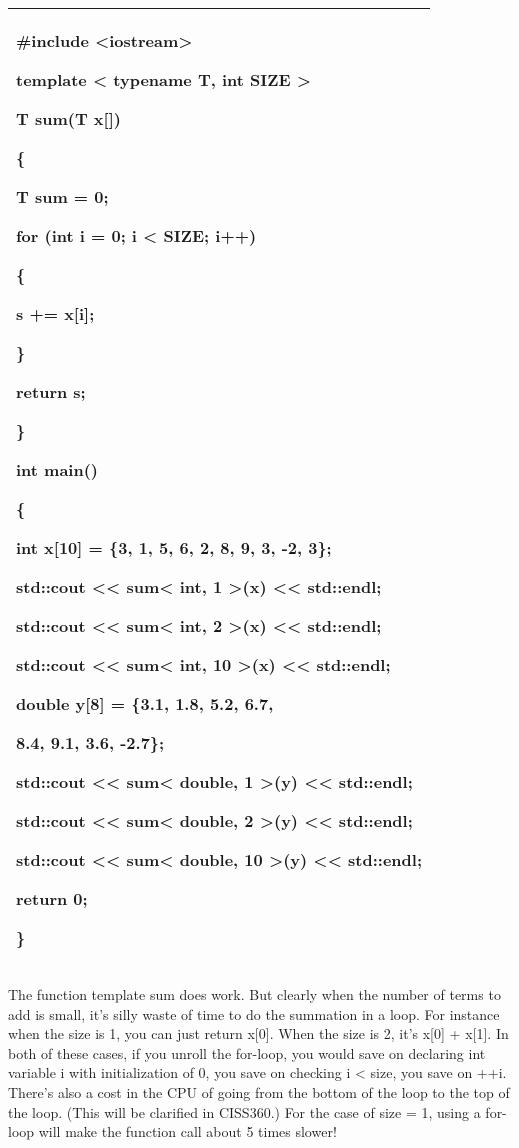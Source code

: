 \documentclass[
]{article}
\begin{document}
\begin{longtable}[]{@{}l@{}}
\toprule
\endhead
\begin{minipage}[t]{0.97\columnwidth}\raggedright
\#include \textless iostream\textgreater{}

template \textless{} typename T, int SIZE \textgreater{}

T sum(T x{[}{]})

\{

T sum = 0;

for (int i = 0; i \textless{} SIZE; i++)

\{

s += x{[}i{]};

\}

return s;

\}

int main()

\{

int x{[}10{]} = \{3, 1, 5, 6, 2, 8, 9, 3, -2, 3\};

std::cout \textless\textless{} sum\textless{} int, 1 \textgreater(x)
\textless\textless{} std::endl;

std::cout \textless\textless{} sum\textless{} int, 2 \textgreater(x)
\textless\textless{} std::endl;

std::cout \textless\textless{} sum\textless{} int, 10 \textgreater(x)
\textless\textless{} std::endl;

double y{[}8{]} = \{3.1, 1.8, 5.2, 6.7,

8.4, 9.1, 3.6, -2.7\};

std::cout \textless\textless{} sum\textless{} double, 1 \textgreater(y)
\textless\textless{} std::endl;

std::cout \textless\textless{} sum\textless{} double, 2 \textgreater(y)
\textless\textless{} std::endl;

std::cout \textless\textless{} sum\textless{} double, 10 \textgreater(y)
\textless\textless{} std::endl;

return 0;

\}\strut
\end{minipage}\tabularnewline
\bottomrule
\end{longtable}

The function template sum does work. But clearly when the number of
terms to add is small, it's silly waste of time to do the summation in a
loop. For instance when the size is 1, you can just return x{[}0{]}.
When the size is 2, it's x{[}0{]} + x{[}1{]}. In both of these cases, if
you unroll the for-loop, you would save on declaring int variable i with
initialization of 0, you save on checking i \textless{} size, you save
on ++i. There's also a cost in the CPU of going from the bottom of the
loop to the top of the loop. (This will be clarified in CISS360.) For
the case of size = 1, using a for-loop will make the function call about
5 times slower!
\end{document}
